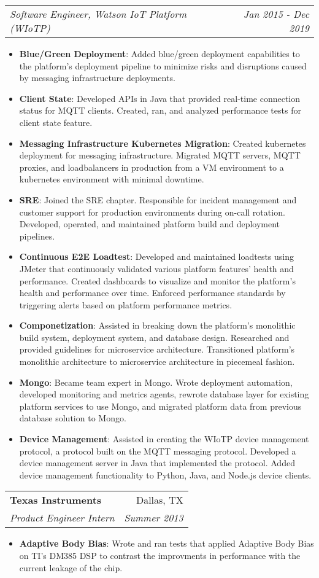 \documentclass[letterpaper,11pt]{article}
\makeatletter
\newcommand{\resumeItem}[2]{
  \item\small{
    \textbf{#1}{: #2 \vspace{-2pt}}
  }
}
\newcommand{\resumeSubheading}[4]{
  \vspace{-1pt}\item
    \begin{tabular*}{0.97\textwidth}[t]{l@{\extracolsep{\fill}}r}
      \textbf{#1} & #2 \\
      \textit{\small#3} & \textit{\small #4} \\
    \end{tabular*}\vspace{-5pt}
}
\newcommand{\resumeSubheadingContinue}[2]{
  \vspace{-1pt}
    \begin{tabular*}{0.97\textwidth}[t]{l@{\extracolsep{\fill}}r}
      \textit{\small#1} & \textit{\small #2} \\
    \end{tabular*}\vspace{-5pt}
}
\newcommand{\resumeItemListStart}{\begin{itemize}}
\newcommand{\resumeItemListEnd}{\end{itemize}\vspace{-5pt}}
\makeatother
\begin{document}
      \resumeSubheadingContinue
        {Software Engineer, Watson IoT Platform (WIoTP)}{Jan 2015 - Dec 2019}
        \resumeItemListStart
          \resumeItem{Blue/Green Deployment}
            {Added blue/green deployment capabilities to the platform's deployment pipeline to minimize risks and disruptions caused by messaging infrastructure deployments.}
          \resumeItem{Client State}
            {Developed APIs in Java that provided real-time connection status for MQTT clients. Created, ran, and analyzed performance tests for client state feature.}
          \resumeItem{Messaging Infrastructure Kubernetes Migration}
            {Created kubernetes deployment for messaging infrastructure. Migrated MQTT servers, MQTT proxies, and loadbalancers in production from a VM environment to a kubernetes environment with minimal downtime.}
          \resumeItem{SRE}
            {Joined the SRE chapter. Responsible for incident management and customer support for production environments during on-call rotation. Developed, operated, and maintained platform build and deployment pipelines.}
          \resumeItem{Continuous E2E Loadtest}
            {Developed and maintained loadtests using JMeter that continuously validated various platform features' health and performance. Created dashboards to visualize and monitor the platform's health and performance over time. Enforced performance standards by triggering alerts based on platform performance metrics.}
          \resumeItem{Componetization}
            {Assisted in breaking down the platform's monolithic build system, deployment system, and database design. Researched and provided guidelines for microservice architecture. Transitioned platform's monolithic architecture to microservice architecture in piecemeal fashion.}
          \resumeItem{Mongo}
            {Became team expert in Mongo. Wrote deployment automation, developed monitoring and metrics agents, rewrote database layer for existing platform services to use Mongo, and migrated platform data from previous database solution to Mongo.}
          \resumeItem{Device Management}
            {Assisted in creating the WIoTP device management protocol, a protocol built on the MQTT messaging protocol. Developed a device management server in Java that implemented the protocol. Added device management functionality to Python, Java, and Node.js device clients.}
        \resumeItemListEnd
  
    \resumeSubheading
      {Texas Instruments}{Dallas, TX}
      {Product Engineer Intern}{Summer 2013}
      \resumeItemListStart
        \resumeItem{Adaptive Body Bias}
          {Wrote and ran tests that applied Adaptive Body Bias on TI's DM385 DSP to contrast the improvments in performance with the current leakage of the chip.}
      \resumeItemListEnd
\end{document}
